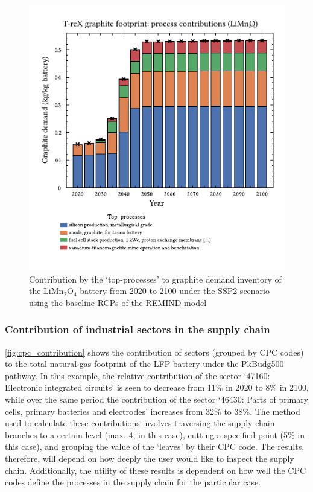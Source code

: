 \documentclass[a4paper,fleqn]{cas-dc}
\begin{document}
\begin{figure}
	\centering
	\includegraphics[width=0.9\columnwidth]{figures/T-reX-wastefootprint-processcontributions.pdf}
	\caption{Contribution by the `top-processes' to graphite demand inventory of the LiMn\(_2\)O\(_4\) battery from 2020 to 2100 under the SSP2 scenario using the baseline RCPs of the REMIND model}\label{fig:top_contribution}
\end{figure}


\subsubsection{Contribution of industrial sectors in the supply chain}\label{sec:results-case_study-topsectors}

\autoref{fig:cpc_contribution} shows the contribution of sectors (grouped by CPC codes) to the total natural gas footprint of the LFP battery under the PkBudg500 pathway. In this example, the relative contribution of the sector `47160: Electronic integrated circuits' is seen to decrease from 11\% in 2020 to 8\% in 2100, while over the same period the contribution of the sector `46430: Parts of primary cells, primary batteries and electrodes' increases from 32\% to 38\%. The method used to calculate these contributions involves traversing the supply chain branches to a certain level (max. 4, in this case), cutting a specified point (5\% in this case), and grouping the value of the `leaves' by their CPC code. The results, therefore, will depend on how deeply the user would like to inspect the supply chain. Additionally, the utility of these results is dependent on how well the CPC codes define the processes in the supply chain for the particular case.
\end{document}
